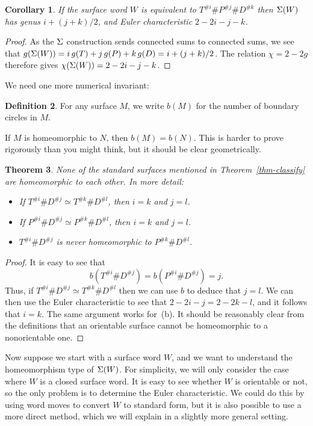 \documentclass[reqno]{amsart}
\newtheorem{theorem}{Theorem}[section]
\newtheorem{corollary}[theorem]{Corollary}
\theoremstyle{definition}
\newtheorem{definition}[theorem]{Definition}
\begin{document}
\begin{corollary}
 If the surface word $W$ is equivalent to
 $T^{\# i}\# P^{\# j}\# D^{\# k}$ then $\Sigma(W)$ has genus $i+(j+k)/2$,
 and Euler characteristic $2-2i-j-k$.
\end{corollary}
\begin{proof}
 As the $\Sigma$ construction sends connected sums to connected sums, we
 see that $g(\Sigma(W))=i\,g(T)+j\,g(P)+k\,g(D)=i+(j+k)/2$.  The relation
 $\chi=2-2g$ therefore gives $\chi(\Sigma(W))=2-2i-j-k$.  
\end{proof}

We need one more numerical invariant:
\begin{definition}
 For any surface $M$, we write $b(M)$ for the number of boundary
 circles in $M$.
\end{definition}

If $M$ is homeomorphic to $N$, then $b(M)=b(N)$.  This is harder to
prove rigorously than you might think, but it should be clear
geometrically.  

\begin{theorem}\label{thm-classify-unique}
 None of the standard surfaces mentioned in Theorem~\ref{thm-classify}
 are homeomorphic to each other.  In more detail:
 \begin{itemize}
  \item[(a)] If $T^{\# i}\# D^{\# j}\simeq T^{\# k}\# D^{\# l}$, then $i=k$
   and $j=l$.
  \item[(b)] If $P^{\# i}\# D^{\# j}\simeq P^{\# k}\# D^{\# l}$, then $i=k$
   and $j=l$.
  \item[(c)] $T^{\# i}\# D^{\# j}$ is never homeomorphic to
   $P^{\# k}\# D^{\# l}$.
 \end{itemize}
\end{theorem}
\begin{proof}
 It is easy to see that 
 \[ b(T^{\# i}\# D^{\# j})=b(P^{\# i}\# D^{\# j})=j. \]
 Thus, if $T^{\# i}\# D^{\# j}\simeq T^{\# k}\# D^{\# l}$ then we can
 use $b$ to deduce that $j=l$.  We can then use the Euler
 characteristic to see that $2-2i-j=2-2k-l$, and it follows that
 $i=k$.  The same argument works for~(b).  It should be reasonably
 clear from the definitions that an orientable surface cannot be
 homeomorphic to a nonorientable one.
\end{proof}

Now suppose we start with a surface word $W$, and we want to
understand the homeomorphism type of $\Sigma(W)$.  For simplicity, we
will only consider the case where $W$ is a closed surface word.  It is
easy to see whether $W$ is orientable or not, so the only problem is
to determine the Euler characteristic.  We could do this by using word
moves to convert $W$ to standard form, but it is also possible to use
a more direct method, which we will explain in a slightly more general
setting.  
\end{document}
